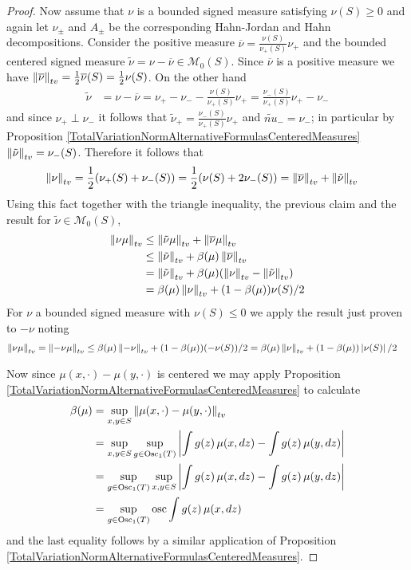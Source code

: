 \begin{proof}
Now assume that $\nu$ is a bounded signed measure satisfying $\nu(S) \geq 0$ and again let $\nu_\pm$ and $A_\pm$ be the corresponding Hahn-Jordan and Hahn decompositions.
Consider the positive measure $\overline{\nu} = \frac{\nu(S)}{\nu_+(S)} \nu_+$ and the bounded centered signed measure $\tilde{\nu} = \nu - \overline{\nu} \in \mathcal{M}_0(S)$.
Since $\overline{\nu}$ is a positive measure we have $\left \lVert  \overline{\nu} \right \rVert_{tv} = \frac{1}{2}\overline{\nu} (S) = \frac{1}{2}\nu(S)$.  On the other hand
\begin{align*}
\tilde{\nu} &= \nu - \overline{\nu} = \nu_+ - \nu_- - \frac{\nu(S)}{\nu_+(S)} \nu_+ = \frac{\nu_-(S)}{\nu_+(S)} \nu_+ - \nu_-
\end{align*}
and since $\nu_+ \perp \nu_-$ it follows that $\tilde{\nu}_+ = \frac{\nu_-(S)}{\nu_+(S)} \nu_+$ and $\tilde{nu}_- = \nu_-$; in particular by Proposition \ref{TotalVariationNormAlternativeFormulasCenteredMeasures} $\left \lVert  \tilde{\nu} \right \rVert_{tv} = \nu_-(S)$.  Therefore it follows that
\begin{align*}
\left \lVert  \nu \right \rVert_{tv} &= \frac{1}{2} ( \nu_+(S) + \nu_-(S)) = \frac{1}{2} ( \nu(S) + 2 \nu_-(S)) = \left \lVert  \overline{\nu} \right \rVert_{tv} + \left \lVert  \tilde{\nu} \right \rVert_{tv} 
\end{align*}
Using this fact together with the triangle inequality, the previous claim and the result for $\tilde{\nu} \in \mathcal{M}_0(S)$,
\begin{align*}
\left \lVert  \nu \mu \right \rVert_{tv} &\leq \left \lVert  \tilde{\nu} \mu \right \rVert_{tv} + \left \lVert  \overline{\nu} \mu \right \rVert_{tv} \\
&\leq \left \lVert  \tilde{\nu} \right \rVert_{tv} + \beta(\mu) \left \lVert  \overline{\nu} \right \rVert_{tv} \\
&= \left \lVert  \tilde{\nu} \right \rVert_{tv} + \beta(\mu) (\left \lVert  \nu \right \rVert_{tv} - \left \lVert  \tilde{\nu} \right \rVert_{tv}) \\
&= \beta(\mu) \left \lVert  \nu \right \rVert_{tv} + (1 - \beta(\mu)) \nu(S)/2 \\
\end{align*}
For $\nu$ a bounded signed measure with $\nu(S) \leq 0$ we apply the result just proven to $-\nu$  noting
\begin{align*}
\left \lVert  \nu \mu \right \rVert_{tv} &=\left \lVert  -\nu \mu \right \rVert_{tv} \leq \beta(\mu) \left \lVert  -\nu \right \rVert_{tv} + (1 - \beta(\mu)) (-\nu(S))/2  = \beta(\mu) \left \lVert  \nu \right \rVert_{tv} + (1 - \beta(\mu)) \left \vert \nu(S) \right \vert/2
\end{align*}

Now since $\mu(x, \cdot) - \mu(y, \cdot)$ is centered we may apply Proposition \ref{TotalVariationNormAlternativeFormulasCenteredMeasures} to calculate
\begin{align*}
\beta(\mu) &= \sup_{x,y \in S} \tvnorm{\mu(x, \cdot) - \mu(y, \cdot)} \\
&= \sup_{x,y \in S}\sup_{g \in \Osc1(T)} \abs{\int g(z) \, \mu(x, dz)  - \int g(z) \, \mu(y, dz)} \\
&= \sup_{g \in \Osc1(T)} \sup_{x,y \in S} \abs{\int g(z) \, \mu(x, dz)  - \int g(z) \, \mu(y, dz)} \\
&= \sup_{g \in \Osc1(T)} \osc{\int g(z) \, \mu(x, dz)} \\
\end{align*}
and the last equality follows by a similar application of Proposition \ref{TotalVariationNormAlternativeFormulasCenteredMeasures}.
\end{proof}

